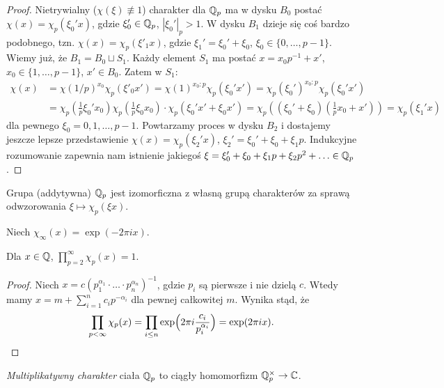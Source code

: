 \begin{proof}
	Nietrywialny ($\chi(\xi) \not \equiv 1$) charakter dla $\mathbb Q_p$ ma w dysku $B_0$ postać $\chi(x) = \chi_p(\xi_0'x)$, gdzie $\xi_0' \in \mathbb Q_p$, $|\xi_0'|_p > 1$.
	W dysku $B_1$ dzieje się coś bardzo podobnego, tzn. $\chi (x) = \chi_p(\xi'_1 x)$, gdzie $\xi_1' = \xi_0' + \xi_0$, $\xi_0 \in \{0, \ldots, p-1\}$.
	Wiemy już, że $B_1 = B_0 \sqcup S_1$.
	Każdy element $S_1$ ma postać $x = x_0 p^{-1} + x'$, $x_0 \in \{1, \ldots, p-1\}$, $x' \in B_0$.
	Zatem w $S_1$:
	\begin{align*} 
		\chi(x) & = \chi(1/p)^{x_0} \chi_p (\xi'_0 x') = \chi(1)^{x_0 : p} \chi_p (\xi_0' x') = \chi_p(\xi_0')^{x_0 : p} \chi_p (\xi_0' x') \\ & \textstyle = \chi_p(\frac 1p\xi_0' x_0 ) \chi_p(\frac 1p\xi_0 x_0) \cdot \chi_p(\xi_0' x' + \xi_0 x') = \chi_p((\xi_0' + \xi_0)(\frac 1px_0 + x'))  = \chi_p (\xi_1' x)
	\end{align*}
	dla pewnego $\xi_0 = 0, 1, \ldots, p-1$.
	Powtarzamy proces w dysku $B_2$ i dostajemy jeszcze lepsze przedstawienie $\chi(x) = \chi_p(\xi_2' x)$, $\xi_2' = \xi_0' + \xi_0 + \xi_1 p$.
	Indukcyjne rozumowanie zapewnia nam istnienie jakiegoś $\xi = \xi_0' + \xi_0 + \xi_1 p + \xi_2 p^2 + \ldots \in \mathbb Q_p$.
\end{proof}

\begin{wniosek}
	Grupa (addytywna) $\mathbb Q_p$ jest izomorficzna z własną grupą charakterów za sprawą odwzorowania $\xi \mapsto \chi_p(\xi x)$.
\end{wniosek}

Niech $\chi_\infty(x) = \exp(- 2 \pi i x)$.

\begin{fakt}[,,adelizm'']
	Dla $x \in \mathbb Q$, $\prod_{p = 2}^\infty \chi_p(x) = 1$.
\end{fakt}

\begin{proof}
	Niech $x = c (p_1^{\alpha_1} \cdot \ldots \cdot p_n^{\alpha_n})^{-1}$, gdzie $p_i$ są pierwsze i nie dzielą $c$.
	Wtedy mamy $x = m + \sum_{i=1}^{n} c_ip^{-\alpha_i}$ dla pewnej całkowitej $m$.
	Wynika stąd, że
	\[
		\prod_{p < \infty} \chi_p(x) = \prod_{i \le n} \exp \Bigl(2 \pi i \frac{c_i}{p_i^{\alpha_i}} \Bigr) = \exp (2 \pi i x). \qedhere
	\]
\end{proof}

\begin{definicja}
	\emph{Multiplikatywny charakter} ciała $\mathbb Q_p$ to ciągły homomorfizm $\mathbb Q_p^\times \to \mathbb C$. %
\end{definicja}

